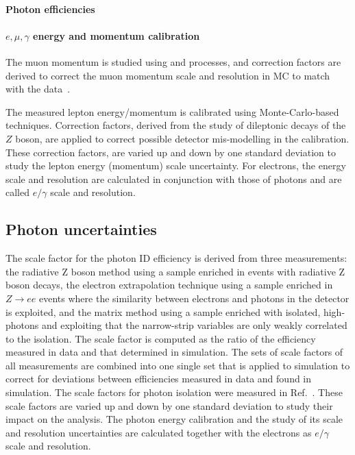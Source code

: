 \paragraph{Photon efficiencies}

\paragraph{$e,\mu,\gamma$ energy and momentum calibration}
The muon momentum is studied using \zmumu and \jpsimumu processes, and correction factors are derived to correct the muon momentum scale and resolution in MC to match with the data~\cite{ATLAS:2016lqx}.



The measured lepton energy/momentum is calibrated using Monte-Carlo-based techniques. Correction factors, derived from the study of dileptonic decays of the $Z$ boson, are applied to correct possible detector mis-modelling in the calibration. These correction factors, are varied up and down by one standard deviation to study the lepton energy (momentum) scale uncertainty. For electrons, the energy scale and resolution are calculated in conjunction with those of photons and are called $e/\gamma$ scale and resolution.

\subsection*{Photon uncertainties}

The scale factor for the photon ID efficiency is derived from three measurements: the radiative Z boson method using a sample enriched in events with radiative Z boson decays, the electron extrapolation technique using a sample enriched in $Z \to ee$ events where the similarity between electrons and photons in the detector is exploited, and the matrix method using a sample enriched with isolated, high-\pT photons and exploiting that the narrow-strip variables are only weakly correlated to the isolation. The scale factor is computed as the ratio of the efficiency measured in data and that determined in simulation. The sets of scale factors of all measurements are combined into one single set that is applied to simulation to correct for deviations between efficiencies measured in data and found in simulation. The scale factors for photon isolation were measured in Ref.~\cite{ATL-PHYS-PUB-2016-014}. These scale factors are varied up and down by one standard deviation to study their impact on the analysis. The photon energy calibration and the study of its scale and resolution uncertainties are calculated together with the electrons as $e/\gamma$ scale and resolution.


